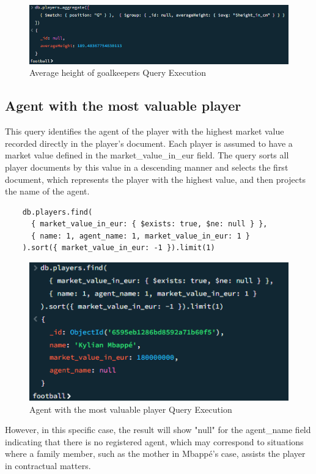 \documentclass{Configuration_Files/PoliMi3i_thesis}
\begin{document}
\begin{figure}[htbp]
    \centering
    \includegraphics[scale=1]{Images/Queries/Avg_goalkeepers_height/agh.png}
    \caption{Average height of goalkeepers Query Execution}
\end{figure}

\subsection{Agent with the most valuable player}
This query identifies the agent of the player with the highest market value recorded directly in the player's document. Each player is assumed to have a market value defined in the market\_value\_in\_eur field. The query sorts all player documents by this value in a descending manner and selects the first document, which represents the player with the highest value, and then projects the name of the agent.

\begin{verbatim}
    db.players.find(
      { market_value_in_eur: { $exists: true, $ne: null } },
      { name: 1, agent_name: 1, market_value_in_eur: 1 }
    ).sort({ market_value_in_eur: -1 }).limit(1)
\end{verbatim}

\begin{figure}[htbp]
    \centering
    \includegraphics[scale=0.8]{Images/Queries/Most_valuable_player_agent/mvpa.png}
    \caption{Agent with the most valuable player Query Execution}
\end{figure}
However, in this specific case, the result will show "null" for the agent\_name field indicating that there is no registered agent, which may correspond to situations where a family member, such as the mother in Mbappé's case, assists the player in contractual matters.
\newpage
\end{document}
